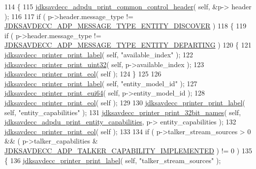 \begin{DoxyCode}
114 \{
115     \hyperlink{group__adp__print_ga744463f0fee49761a57b82dcddd2a962}{jdksavdecc\_adpdu\_print\_common\_control\_header}( \textcolor{keyword}{self}, &p->
      header );
116 
117     \textcolor{keywordflow}{if} ( p->header.message\_type != \hyperlink{group__adpdu__msg_ga71372df276c0ad5c2b62ba9cd8bcacbd}{JDKSAVDECC\_ADP\_MESSAGE\_TYPE\_ENTITY\_DISCOVER}
       )
118     \{
119         \textcolor{keywordflow}{if} ( p->header.message\_type != 
      \hyperlink{group__adpdu__msg_ga2c307c257b44926f0299f86c1b2dc94b}{JDKSAVDECC\_ADP\_MESSAGE\_TYPE\_ENTITY\_DEPARTING} )
120         \{
121             \hyperlink{group__util_gaf7818b24143b3c7502926a425a242ff5}{jdksavdecc\_printer\_print\_label}( \textcolor{keyword}{self}, \textcolor{stringliteral}{"available\_index"} );
122             \hyperlink{group__util_ga5ab4b0ba019ff6f6aa9d95d77560b294}{jdksavdecc\_printer\_print\_uint32}( \textcolor{keyword}{self}, p->available\_index );
123             \hyperlink{group__util_gacda56c9d3d24593a52c999682fa6e6e3}{jdksavdecc\_printer\_print\_eol}( \textcolor{keyword}{self} );
124         \}
125 
126         \hyperlink{group__util_gaf7818b24143b3c7502926a425a242ff5}{jdksavdecc\_printer\_print\_label}( \textcolor{keyword}{self}, \textcolor{stringliteral}{"entity\_model\_id"} );
127         \hyperlink{group__util_gafdf65e002e889f4fc89db5d1e532eaa3}{jdksavdecc\_printer\_print\_eui64}( \textcolor{keyword}{self}, p->entity\_model\_id );
128         \hyperlink{group__util_gacda56c9d3d24593a52c999682fa6e6e3}{jdksavdecc\_printer\_print\_eol}( \textcolor{keyword}{self} );
129 
130         \hyperlink{group__util_gaf7818b24143b3c7502926a425a242ff5}{jdksavdecc\_printer\_print\_label}( \textcolor{keyword}{self}, \textcolor{stringliteral}{"entity\_capabilities"} );
131         \hyperlink{group__util_ga12c5206fd238e3e8188693746f0d8ce7}{jdksavdecc\_printer\_print\_32bit\_names}( \textcolor{keyword}{self}, 
      \hyperlink{group__adp__print_ga7983dab1767e3e1cbdf1c8871ffc93b3}{jdksavdecc\_adpdu\_print\_entity\_capabilities}, p->
      entity\_capabilities );
132         \hyperlink{group__util_gacda56c9d3d24593a52c999682fa6e6e3}{jdksavdecc\_printer\_print\_eol}( \textcolor{keyword}{self} );
133 
134         \textcolor{keywordflow}{if} ( p->talker\_stream\_sources > 0 && ( p->talker\_capabilities & 
      \hyperlink{group__talker__capability_ga9776f9e7ce43fb45783afc9ffcb620a4}{JDKSAVDECC\_ADP\_TALKER\_CAPABILITY\_IMPLEMENTED} ) != 0 )
135         \{
136             \hyperlink{group__util_gaf7818b24143b3c7502926a425a242ff5}{jdksavdecc\_printer\_print\_label}( \textcolor{keyword}{self}, \textcolor{stringliteral}{"talker\_stream\_sources"} );

\end{DoxyCode}
